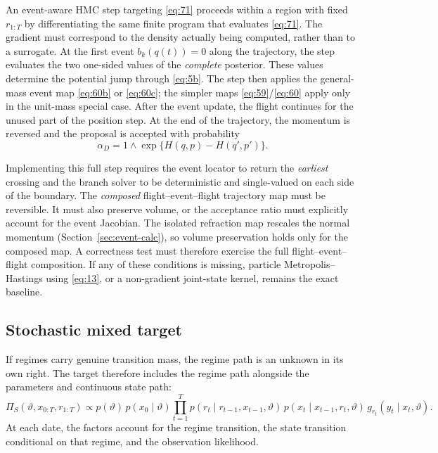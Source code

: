 \documentclass[11pt]{article}
\begin{document}
An event-aware HMC step targeting \eqref{eq:71} proceeds within a region
with fixed $r_{1:T}$ by differentiating the same finite program that
evaluates \eqref{eq:71}. The gradient must correspond to the density
actually being computed, rather than to a surrogate. At the first event
$b_k(q(t))=0$ along the trajectory, the step evaluates the two one-sided
values of the \emph{complete} posterior. These values determine the potential
jump through \eqref{eq:5b}. The step then applies the general-mass event
map \eqref{eq:60b} or \eqref{eq:60c}; the simpler maps
\eqref{eq:59}/\eqref{eq:60} apply only in the unit-mass special case.
After the event update, the flight continues for the unused part of the
position step. At the end of the trajectory, the momentum is reversed and
the proposal is accepted with probability
\begin{equation}\label{eq:72}
 \alpha_D=1\wedge\exp\{H(q,p)-H(q',p')\}.
\end{equation}

Implementing this full step requires the event locator to return the
\emph{earliest} crossing and the branch solver to be deterministic and
single-valued on each side of the boundary. The \emph{composed}
flight--event--flight trajectory map must be reversible. It must also preserve
volume, or the acceptance ratio must explicitly account for the event
Jacobian. The isolated refraction map rescales the normal momentum
(Section~\ref{sec:event-calc}), so volume preservation holds only for the
composed map. A correctness test must therefore exercise the full
flight--event--flight composition. If any of these conditions is missing,
particle Metropolis--Hastings using \eqref{eq:13}, or a non-gradient
joint-state kernel, remains the exact baseline.

\subsection{Stochastic mixed target}\label{sec:target-stoch}

If regimes carry genuine transition mass, the regime path is an unknown in its
own right. The target therefore includes the regime path alongside the
parameters and continuous state path:
\begin{equation}\label{eq:73}
 \Pi_S(\vartheta,x_{0:T},r_{1:T})\propto
 p(\vartheta)\,p(x_0\mid\vartheta)
 \prod_{t=1}^T p(r_t\mid r_{t-1},x_{t-1},\vartheta)\,
 p(x_t\mid x_{t-1},r_t,\vartheta)\,
 g_{r_t}(y_t\mid x_t,\vartheta).
\end{equation}
At each date, the factors account for the regime transition, the state
transition conditional on that regime, and the observation likelihood.
\end{document}
